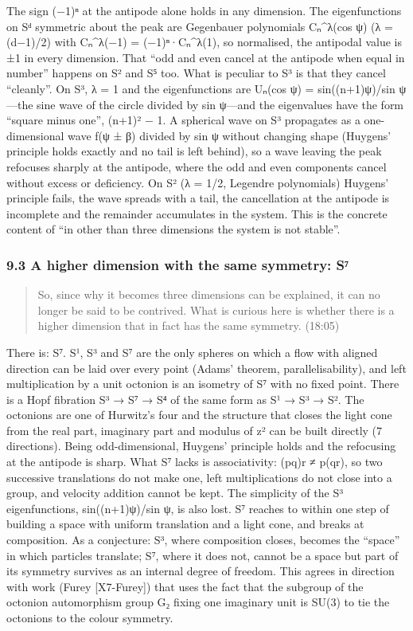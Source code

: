 \documentclass[
  a4paper,
]{article}
\begin{document}
The sign (−1)ⁿ at the antipode alone holds in any dimension. The
eigenfunctions on Sᵈ symmetric about the peak are Gegenbauer polynomials
Cₙ\^{}λ(cos ψ) (λ = (d−1)/2) with Cₙ\^{}λ(−1) = (−1)ⁿ·Cₙ\^{}λ(1), so
normalised, the antipodal value is ±1 in every dimension. That ``odd and
even cancel at the antipode when equal in number'' happens on S² and S⁵
too. What is peculiar to S³ is that they cancel ``cleanly''. On S³, λ =
1 and the eigenfunctions are Uₙ(cos ψ) = sin((n+1)ψ)/sin ψ---the sine
wave of the circle divided by sin ψ---and the eigenvalues have the form
``square minus one'', (n+1)² − 1. A spherical wave on S³ propagates as a
one-dimensional wave f(ψ ± β) divided by sin ψ without changing shape
(Huygens' principle holds exactly and no tail is left behind), so a wave
leaving the peak refocuses sharply at the antipode, where the odd and
even components cancel without excess or deficiency. On S² (λ = 1/2,
Legendre polynomials) Huygens' principle fails, the wave spreads with a
tail, the cancellation at the antipode is incomplete and the remainder
accumulates in the system. This is the concrete content of ``in other
than three dimensions the system is not stable''.

\subsubsection{9.3 A higher dimension with the same symmetry:
S⁷}\label{a-higher-dimension-with-the-same-symmetry-sux2077}

\begin{quote}
So, since why it becomes three dimensions can be explained, it can no
longer be said to be contrived. What is curious here is whether there is
a higher dimension that in fact has the same symmetry. (18:05)
\end{quote}

There is: S⁷. S¹, S³ and S⁷ are the only spheres on which a flow with
aligned direction can be laid over every point (Adams' theorem,
parallelisability), and left multiplication by a unit octonion is an
isometry of S⁷ with no fixed point. There is a Hopf fibration S³ → S⁷ →
S⁴ of the same form as S¹ → S³ → S². The octonions are one of Hurwitz's
four and the structure that closes the light cone from the real part,
imaginary part and modulus of z² can be built directly (7 directions).
Being odd-dimensional, Huygens' principle holds and the refocusing at
the antipode is sharp. What S⁷ lacks is associativity: (pq)r ≠ p(qr), so
two successive translations do not make one, left multiplications do not
close into a group, and velocity addition cannot be kept. The simplicity
of the S³ eigenfunctions, sin((n+1)ψ)/sin ψ, is also lost. S⁷ reaches to
within one step of building a space with uniform translation and a light
cone, and breaks at composition. As a conjecture: S³, where composition
closes, becomes the ``space'' in which particles translate; S⁷, where it
does not, cannot be a space but part of its symmetry survives as an
internal degree of freedom. This agrees in direction with work (Furey
{[}X7-Furey{]}) that uses the fact that the subgroup of the octonion
automorphism group G₂ fixing one imaginary unit is SU(3) to tie the
octonions to the colour symmetry.
\end{document}
